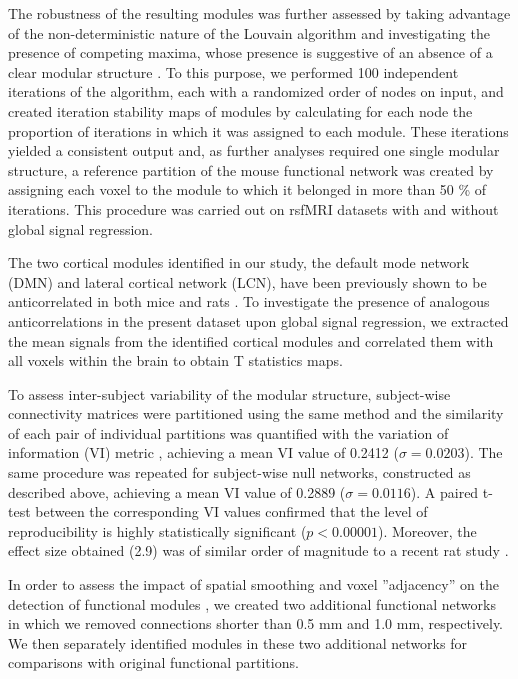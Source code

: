 The robustness of the resulting modules was further assessed by taking advantage
of the non-deterministic nature of the Louvain algorithm \parencite{blondel2008}
and investigating the presence of competing maxima, whose presence is suggestive
of an absence of a clear modular structure \parencite{gfeller2005, karrer2008,
massen2006, wilkinson2004}. To this purpose, we performed 100 independent
iterations of the algorithm, each with a randomized order of nodes on input, and
created iteration stability maps of modules by calculating for each node the
proportion of iterations in which it was assigned to each module. These
iterations yielded a consistent output and, as further analyses required one
single modular structure, a reference partition of the mouse functional network
was created by assigning each voxel to the module to which it belonged in more
than 50 \% of iterations. This procedure was carried out on rsfMRI datasets with
and without global signal regression. 

The two cortical modules identified in our study, the default mode network (DMN)
and lateral cortical network (LCN), have been previously shown to be
anticorrelated in both mice and rats \parencite{schwarz2013a, sforazzini2016}.
To investigate the presence of analogous anticorrelations in the present dataset
upon global signal regression, we extracted the mean signals from the identified
cortical modules and correlated them with all voxels within the brain to obtain
T statistics maps.

To assess inter-subject variability of the modular structure, subject-wise
connectivity matrices were partitioned using the same method and the similarity
of each pair of individual partitions was quantified with the variation of
information (VI) metric \parencite{rubinov2011}, achieving a mean VI value of 0.2412 ($\sigma =
0.0203$). The same procedure was repeated for subject-wise null networks,
constructed as described above, achieving a mean VI value of 0.2889 ($\sigma =
0.0116$). A paired t-test between the corresponding VI values confirmed that the
level of reproducibility is highly statistically significant ($p < 0.00001$).
Moreover, the effect size obtained (2.9) was of similar order of magnitude to a
recent rat study \parencite{dsouza2014}.

In order to assess the impact of spatial smoothing and voxel ''adjacency'' on
the detection of functional modules \parencite{power2011}, we created two
additional functional networks in which we removed connections shorter than 0.5
mm and 1.0 mm, respectively. We then separately identified modules in these two
additional networks for comparisons with original functional partitions.


